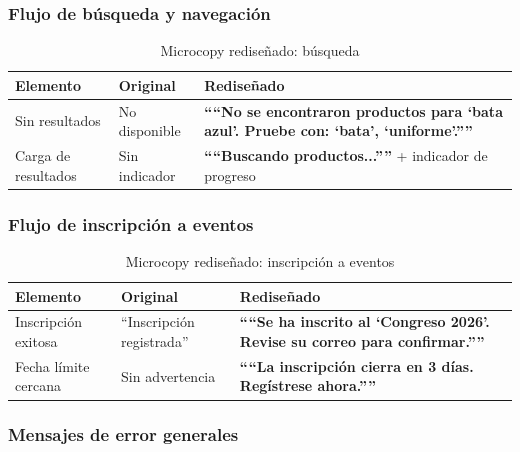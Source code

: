 \documentclass[conference]{IEEEtran}
\newcommand{\buenEjemplo}[1]{\textcolor{colorBueno}{\textbf{``#1''}}}
\begin{document}
\subsubsection{Flujo de búsqueda y navegación}

\begin{table}[H]
\centering
\caption{Microcopy rediseñado: búsqueda}
\label{tab:busqueda}
\setlength{\tabcolsep}{3pt}
\renewcommand{\arraystretch}{1.2}
\begin{tabular}{|p{1.8cm}|p{2.2cm}|p{3cm}|}
\hline
\textbf{Elemento} & \textbf{Original} & \textbf{Rediseñado} \\
\hline
Sin resultados & No disponible & \buenEjemplo{``No se encontraron productos para `bata azul'. Pruebe con: `bata', `uniforme'.''} \\
\hline
Carga de resultados & Sin indicador & \buenEjemplo{``Buscando productos...''} + indicador de progreso \\
\hline
\end{tabular}
\end{table}

\subsubsection{Flujo de inscripción a eventos}

\begin{table}[H]
\centering
\caption{Microcopy rediseñado: inscripción a eventos}
\label{tab:eventos}
\setlength{\tabcolsep}{3pt}
\renewcommand{\arraystretch}{1.2}
\begin{tabular}{|p{1.8cm}|p{2.2cm}|p{3cm}|}
\hline
\textbf{Elemento} & \textbf{Original} & \textbf{Rediseñado} \\
\hline
Inscripción exitosa & ``Inscripción registrada'' & \buenEjemplo{``Se ha inscrito al `Congreso 2026'. Revise su correo para confirmar.''} \\
\hline
Fecha límite cercana & Sin advertencia & \buenEjemplo{``La inscripción cierra en 3 días. Regístrese ahora.''} \\
\hline
\end{tabular}
\end{table}

\subsubsection{Mensajes de error generales}
\end{document}
